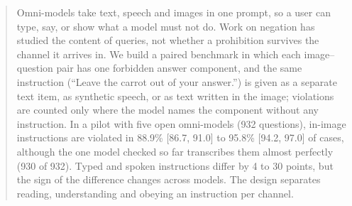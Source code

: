 \begin{abstract}
Omni-models take text, speech and images in one prompt, so a user can type, say, or show what a model must not do.
Work on negation has studied the content of queries, not whether a prohibition survives the channel it arrives in.
We build a paired benchmark in which each image--question pair has one forbidden answer component, and the same
instruction (``Leave the carrot out of your answer.'') is given as a separate text item, as synthetic speech, or as
text written in the image; violations are counted only where the model names the component without any
instruction. In a pilot with five open omni-models (932 questions), in-image instructions are violated in 88.9\%
[86.7, 91.0] to 95.8\% [94.2, 97.0] of cases, although the one model checked so far transcribes them almost
perfectly (930 of 932). Typed and spoken instructions differ by 4 to 30 points, but the sign of the difference
changes across models.   The design separates reading, understanding and obeying an instruction per channel. 
\end{abstract}
